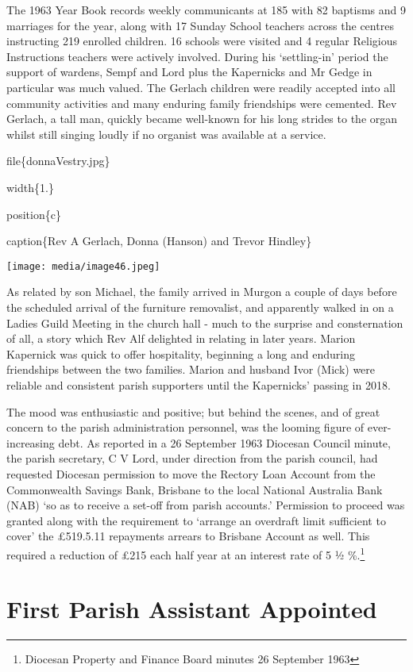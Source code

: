 The 1963 Year Book records weekly communicants at 185 with 82 baptisms and 9 marriages for the year, along with 17 Sunday School teachers across the centres instructing 219 enrolled children. 16 schools were visited and 4 regular Religious Instructions teachers were actively involved. During his `settling-in' period the support of wardens, Sempf and Lord plus the Kapernicks and Mr Gedge in particular was much valued. The Gerlach children were readily accepted into all community activities and many enduring family friendships were cemented. Rev Gerlach, a tall man, quickly became well-known for his long strides to the organ whilst still singing loudly if no organist was available at a service.

file\{donnaVestry.jpg\}

width\{1.\}

position\{c\}

caption\{Rev A Gerlach, Donna (Hanson) and Trevor Hindley\}

\texttt{[image: media/image46.jpeg]}

As related by son Michael, the family arrived in Murgon a couple of days before the scheduled arrival of the furniture removalist, and apparently walked in on a Ladies Guild Meeting in the church hall - much to the surprise and consternation of all, a story which Rev Alf delighted in relating in later years. Marion Kapernick was quick to offer hospitality, beginning a long and enduring friendships between the two families. Marion and husband Ivor (Mick) were reliable and consistent parish supporters until the Kapernicks' passing in 2018.

The mood was enthusiastic and positive; but behind the scenes, and of great concern to the parish administration personnel, was the looming figure of ever-increasing debt. As reported in a 26 September 1963 Diocesan Council minute, the parish secretary, C V Lord, under direction from the parish council, had requested Diocesan permission to move the Rectory Loan Account from the Commonwealth Savings Bank, Brisbane to the local National Australia Bank (NAB) `so as to receive a set-off from parish accounts.' Permission to proceed was granted along with the requirement to `arrange an overdraft limit sufficient to cover' the £519.5.11 repayments arrears to Brisbane Account as well. This required a reduction of £215 each half year at an interest rate of 5 ½ \%.\footnote{Diocesan Property and Finance Board minutes 26 September 1963}

\hypertarget{first-parish-assistant-appointed}{%
\section{First Parish Assistant Appointed}\label{first-parish-assistant-appointed}}


